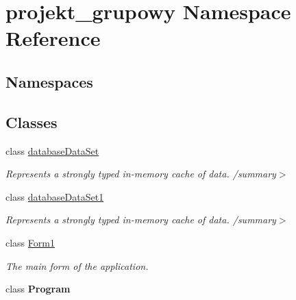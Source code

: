 \hypertarget{namespaceprojekt__grupowy}{}\section{projekt\+\_\+grupowy Namespace Reference}
\label{namespaceprojekt__grupowy}
\subsection*{Namespaces}
\begin{DoxyCompactItemize}
\end{DoxyCompactItemize}
\subsection*{Classes}
\begin{DoxyCompactItemize}
\item 
class \hyperlink{classprojekt__grupowy_1_1database_data_set}{database\+Data\+Set}
\begin{DoxyCompactList}\small\item\em Represents a strongly typed in-\/memory cache of data. /summary$>$ \end{DoxyCompactList}\item 
class \hyperlink{classprojekt__grupowy_1_1database_data_set1}{database\+Data\+Set1}
\begin{DoxyCompactList}\small\item\em Represents a strongly typed in-\/memory cache of data. /summary$>$ \end{DoxyCompactList}\item 
class \hyperlink{classprojekt__grupowy_1_1_form1}{Form1}
\begin{DoxyCompactList}\small\item\em The main form of the application. \end{DoxyCompactList}\item 
class {\bfseries Program}
\end{DoxyCompactItemize}
